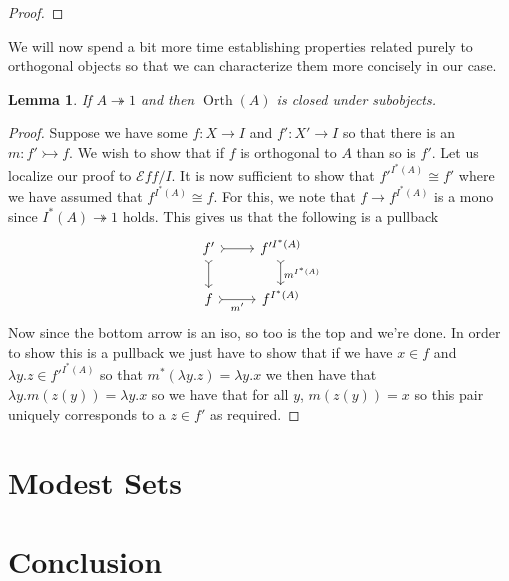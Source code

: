 \documentclass[12pt]{amsart}
\newcommand{\todo}[1]{{\color{red}{\LARGE #1}}}
\newcommand{\eff}{\mathcal{E}\!f\!f}
\newcommand{\epi}{\ensuremath{\twoheadrightarrow}}
\newcommand{\mono}{\ensuremath{\rightarrowtail}}
\DeclareMathOperator{\orth}{Orth}
\newtheorem{lem}[thm]{Lemma}
\begin{document}
\begin{proof}
  \todo{Essentially this means showing that products and equalizers
    preserve orthogonality, $\Pi$ restricts, and pullbacks preserve
    orthogonality}
\end{proof}
We will now spend a bit more time establishing properties related
purely to orthogonal objects so that we can characterize them more
concisely in our case.
\begin{lem}\label{lem:orth:orthsubobjects}
  If $A \epi 1$ and then $\orth(A)$ is closed under subobjects.
\end{lem}
\begin{proof}
  Suppose we have some $f : X \to I$ and $f' : X' \to I$ so that there
  is an $m : f' \mono f$. We wish to show that if $f$ is orthogonal to
  $A$ than so is $f'$. Let us localize our proof to $\eff/I$. It is
  now sufficient to show that $f'^{I^*(A)} \cong f'$ where we have
  assumed that $f^{I^*(A)} \cong f$. For this, we note that
  $f \to f^{I^*(A)}$ is a mono since $I^*(A) \epi 1$ holds. This gives
  us that the following is a pullback
  \[
    \begin{tikzcd}
      f' \ar[d, rightarrowtail] \ar[r, rightarrowtail] & {f'^{I^*(A)}} \ar[d, rightarrowtail, "m^{I^*(A)}"]\\
      f \ar[r, rightarrowtail, swap, "m'"] & {f^{I^*(A)}}
    \end{tikzcd}
  \]
  Now since the bottom arrow is an iso, so too is the top and we're
  done. In order to show this is a pullback we just have to show that
  if we have $x \in f$ and $\lambda y. z \in f'^{I^*(A)}$ so that
  $m^*(\lambda y. z) = \lambda y. x$ we then have that
  $\lambda y. m(z(y)) = \lambda y. x$ so we have that for all $y$,
  $m(z(y)) = x$ so this pair uniquely corresponds to a $z \in f'$ as
  required.
\end{proof}

\section{Modest Sets}\label{sec:modest}
\section{Conclusion}\label{sec:conclusion}


{}
\end{document}
